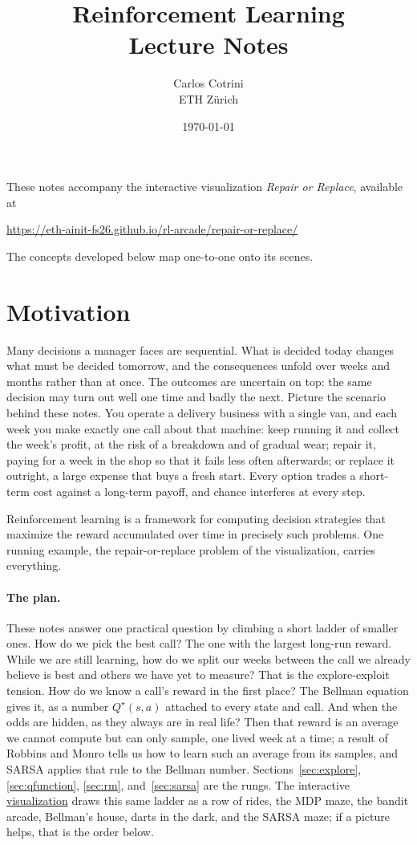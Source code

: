 \documentclass[11pt,a4paper]{article}
\title{Reinforcement Learning\\[0.5ex]\large Lecture Notes}
\author{Carlos Cotrini\\ETH Zürich}
\date{\today}
\theoremstyle{definition}
\theoremstyle{remark}
\numberwithin{equation}{section}
\newcommand{\vizurl}{\url{https://eth-ainit-fs26.github.io/rl-arcade/repair-or-replace/}}
\newcommand{\vizhref}[1]{\href{https://eth-ainit-fs26.github.io/rl-arcade/repair-or-replace/}{#1}}
\begin{document}
\maketitle

\noindent
These notes accompany the interactive visualization \emph{Repair or Replace}, available at
\begin{center}
\vizurl
\end{center}
\noindent
The concepts developed below map one-to-one onto its scenes.

\medskip

\section{Motivation}

Many decisions a manager faces are sequential. What is decided today changes what must be
decided tomorrow, and the consequences unfold over weeks and months rather than at once. The
outcomes are uncertain on top: the same decision may turn out well one time and badly the
next. Picture the scenario behind these notes. You operate a delivery business with a single
van, and each week you make exactly one call about that machine: keep running it and collect
the week's profit, at the risk of a breakdown and of gradual wear; repair it, paying for a
week in the shop so that it fails less often afterwards; or replace it outright, a large
expense that buys a fresh start. Every option trades a short-term cost against a long-term
payoff, and chance interferes at every step.

Reinforcement learning is a framework for computing decision strategies that maximize the
reward accumulated over time in precisely such problems. One running example, the
repair-or-replace problem of the visualization, carries everything.

\paragraph{The plan.}
These notes answer one practical question by climbing a short ladder of smaller ones. How do
we pick the best call? The one with the largest long-run reward. While we are still learning,
how do we split our weeks between the call we already believe is best and others we have yet to
measure? That is the explore-exploit tension. How do we know a call's reward in the first
place? The Bellman equation gives it, as a number $Q^\star(s, a)$ attached to every state and
call. And when the odds are hidden, as they always are in real life? Then that reward is an
average we cannot compute but can only sample, one lived week at a time; a result of Robbins
and Monro tells us how to learn such an average from its samples, and SARSA applies that rule
to the Bellman number. Sections~\ref{sec:explore}, \ref{sec:qfunction}, \ref{sec:rm},
and~\ref{sec:sarsa} are the rungs. The interactive \vizhref{visualization} draws this same
ladder as a row of rides, the MDP maze, the bandit arcade, Bellman's house, darts in the dark,
and the SARSA maze; if a picture helps, that is the order below.
\end{document}
